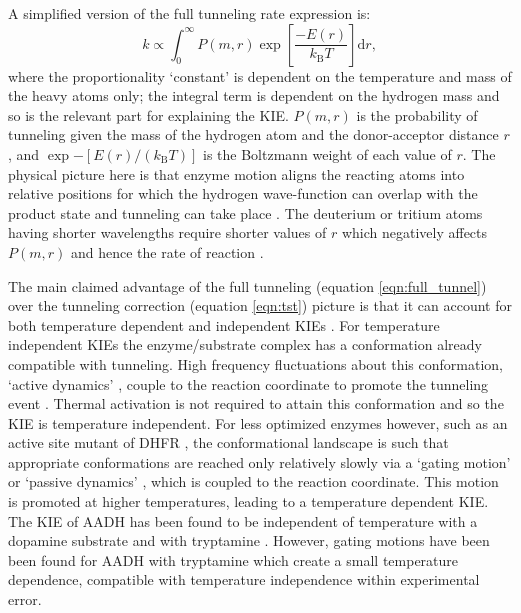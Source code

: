 A simplified version of the full tunneling rate expression \cite{knappTemperatureDependentIsotopeEffects2002, kohenRoleDynamicsEnzyme2015} is: 
\begin{equation}\label{eqn:full_tunnel}
k \propto \int_{0}^{\infty} P(m,r) \exp \left[\frac{-E(r) }{k_{\mathrm{B}} T}\right] \mathrm{d}r,
\end{equation}
where the proportionality `constant' is dependent on the temperature and mass of the heavy atoms only; the integral term is dependent on the hydrogen mass and so is the relevant part for explaining the KIE. $P(m, r)$ is the probability of tunneling given the mass of the hydrogen atom and the donor-acceptor distance $r$, and $\exp{-\left[E(r) /\left(k_{\mathrm{B}} T\right)\right]}$ is the Boltzmann weight of each value of $r$. The physical picture here is that enzyme motion aligns the reacting atoms into relative positions for which the hydrogen wave-function can overlap with the product state and tunneling can take place \cite{klinmanHydrogenTunnelingLinks2013, kohenRoleDynamicsEnzyme2015}. The deuterium or tritium atoms having shorter wavelengths require shorter values of $r$ which negatively affects $P(m,r)$ and hence the rate of reaction \cite{klinmanHydrogenTunnelingLinks2013, kohenRoleDynamicsEnzyme2015}. 

The main claimed advantage of the full tunneling (equation \ref{eqn:full_tunnel}) over the tunneling correction (equation \ref{eqn:tst}) picture is that it can account for both temperature dependent and independent KIEs \cite{klinmanbeyond2009, klinmanHydrogenTunnelingLinks2013}. For temperature independent KIEs the enzyme/substrate complex has a conformation already compatible with tunneling. High frequency fluctuations about this conformation, `active dynamics' \cite{masgrau2004hydrogen}, couple to the reaction coordinate to promote the tunneling event \cite{klinmanbeyond2009, klinmanHydrogenTunnelingLinks2013}. Thermal activation is not required to attain this conformation and so the KIE is temperature independent. For less optimized enzymes however, such as an active site mutant of DHFR \cite{stojkovic2012effects}, the conformational landscape is such that appropriate conformations are reached only relatively slowly via a `gating motion' \cite{johannissenProtonTunnelingAromatic2007} or `passive dynamics' \cite{masgrau2004hydrogen}, which is coupled to the reaction coordinate. This motion is promoted at higher temperatures, leading to a temperature dependent KIE. The KIE of AADH has been found to be independent of temperature with a dopamine substrate \cite{basranImportanceBarrierShape2001a} and with tryptamine \cite{masgrauAtomicDescriptionEnzyme2006}. However, gating motions have been been found for AADH with tryptamine \cite{johannissenEnzymeAromaticAmine2008, johannissenProtonTunnelingAromatic2007} which create a small temperature dependence, compatible with temperature independence within experimental error.

